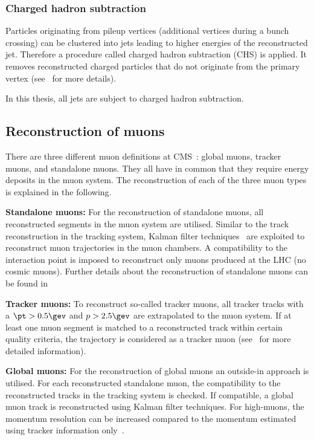 \subsubsection*{Charged hadron subtraction}
Particles originating from pileup vertices (additional vertices during a bunch crossing) can be clustered into jets leading to higher energies of the reconstructed jet.
Therefore a procedure called charged hadron subtraction (CHS) is applied.
It removes reconstructed charged particles that do not originate from the primary vertex (see~\cite{bib:CHS_2012} for more details).

In this thesis, all jets are subject to charged hadron subtraction.



\subsection{Reconstruction of muons}
\label{subsec:MuonReconstruction}
There are three different muon definitions at CMS~\cite{bib:CMS:muon_recoEff}: global muons, tracker muons, and standalone muons.
They all have in common that they require energy deposits in the muon system.
The reconstruction of each of the three muon types is explained in the following.
\begin{description}
\item \textbf{Standalone muons:} For the reconstruction of standalone muons, all reconstructed segments in the muon system are utilised. Similar to the track reconstruction in the tracking system, Kalman filter techniques~\cite{bib:KalmanFilter_1987} are exploited to reconstruct muon trajectories in the muon chambers.
A compatibility to the interaction point is imposed to reconstruct only muons produced at the LHC (no cosmic muons).
Further details about the reconstruction of standalone muons can be found in~\cite{bib:StandaloneMuonReconstruction,bib:CMS:TDR_2006} 
\item \textbf{Tracker muons:} To reconstruct so-called tracker muons, all tracker tracks with a $\pt>0.5\gev$ and $p>2.5\gev$ are extrapolated to the muon system. If at least one muon segment is matched to a reconstructed track within certain quality criteria, the trajectory is considered as a tracker muon (see~\cite{bib:CMS:muon_recoEff} for more detailed information).
\item \textbf{Global muons:} For the reconstruction of global muons an outside-in approach is utilised. For each reconstructed standalone muon, the compatibility to the reconstructed tracks in the tracking system is checked. If compatible, a global muon track is reconstructed using Kalman filter techniques. For high-\pt muons, the momentum resolution can be increased compared to the momentum estimated using tracker information only~\cite{bib:CMS:muon_recoEff}.
\end{description}

